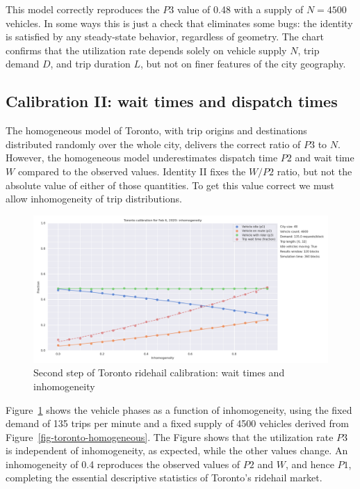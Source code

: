 \documentclass[
  letterpaper,
  DIV=11,
  numbers=noendperiod]{scrartcl}
\begin{document}
This model correctly reproduces the \(P3\) value of 0.48 with a supply
of \(N = 4500\) vehicles. In some ways this is just a check that
eliminates some bugs: the identity is satisfied by any steady-state
behavior, regardless of geometry. The chart confirms that the
utilization rate depends solely on vehicle supply \(N\), trip demand
\(D\), and trip duration \(L\), but not on finer features of the city
geography.

\hypertarget{calibration-ii-wait-times-and-dispatch-times}{%
\subsection{Calibration II: wait times and dispatch
times}\label{calibration-ii-wait-times-and-dispatch-times}}

The homogeneous model of Toronto, with trip origins and destinations
distributed randomly over the whole city, delivers the correct ratio of
\(P3\) to \(N\). However, the homogeneous model underestimates dispatch
time \(P2\) and wait time \(W\) compared to the observed values.
Identity II fixes the \(W/P2\) ratio, but not the absolute value of
either of those quantities. To get this value correct we must allow
inhomogeneity of trip distributions.

\begin{figure}

{\centering \includegraphics{toronto_calibration_inhomogeneous.png}

}

\caption{\label{fig-inhomog}Second step of Toronto ridehail calibration:
wait times and inhomogeneity}

\end{figure}

Figure~\ref{fig-inhomog} shows the vehicle phases as a function of
inhomogeneity, using the fixed demand of 135 trips per minute and a
fixed supply of 4500 vehicles derived from
Figure~\ref{fig-toronto-homogeneous}. The Figure shows that the
utilization rate \(P3\) is independent of inhomogeneity, as expected,
while the other values change. An inhomogeneity of 0.4 reproduces the
observed values of \(P2\) and \(W\), and hence \(P1\), completing the
essential descriptive statistics of Toronto's ridehail market.
\end{document}

